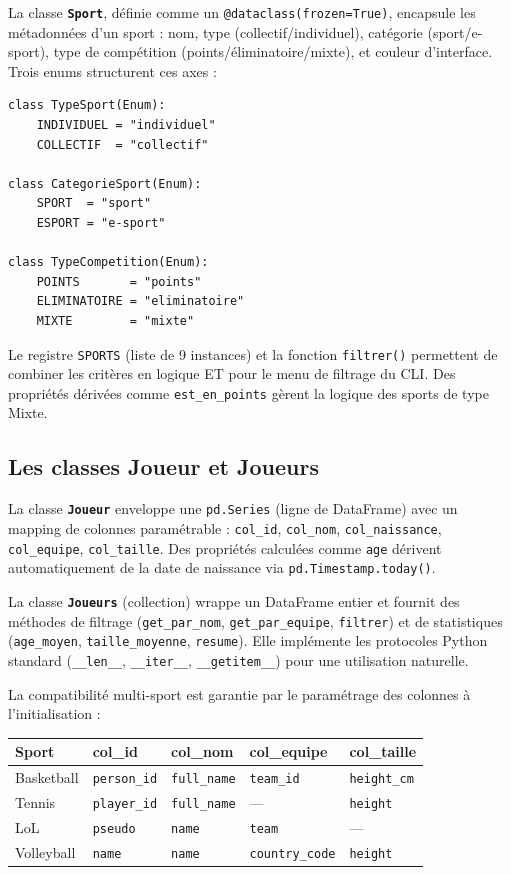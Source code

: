 \documentclass[12pt,a4paper]{article}
\newcommand{\code}[1]{\texttt{#1}}
\newcommand{\classe}[1]{\texttt{\textbf{#1}}}
\begin{document}
La classe \classe{Sport}, définie comme un \code{@dataclass(frozen=True)}, encapsule
les métadonnées d'un sport : nom, type (collectif/individuel), catégorie (sport/e-sport),
type de compétition (points/éliminatoire/mixte), et couleur d'interface. Trois enums
structurent ces axes :

\begin{lstlisting}[caption={Enums de classification des sports (src/Model/sport.py)}]
class TypeSport(Enum):
    INDIVIDUEL = "individuel"
    COLLECTIF  = "collectif"

class CategorieSport(Enum):
    SPORT  = "sport"
    ESPORT = "e-sport"

class TypeCompetition(Enum):
    POINTS       = "points"
    ELIMINATOIRE = "eliminatoire"
    MIXTE        = "mixte"
\end{lstlisting}

Le registre \code{SPORTS} (liste de 9 instances) et la fonction \code{filtrer()} permettent
de combiner les critères en logique ET pour le menu de filtrage du CLI. Des propriétés
dérivées comme \code{est\_en\_points} gèrent la logique des sports de type Mixte.

\subsection{Les classes Joueur et Joueurs}

La classe \classe{Joueur} enveloppe une \code{pd.Series} (ligne de DataFrame) avec un
mapping de colonnes paramétrable : \code{col\_id}, \code{col\_nom},
\code{col\_naissance}, \code{col\_equipe}, \code{col\_taille}. Des propriétés calculées
comme \code{age} dérivent automatiquement de la date de naissance via
\code{pd.Timestamp.today()}.

La classe \classe{Joueurs} (collection) wrappe un DataFrame entier et fournit des méthodes
de filtrage (\code{get\_par\_nom}, \code{get\_par\_equipe}, \code{filtrer}) et de
statistiques (\code{age\_moyen}, \code{taille\_moyenne}, \code{resume}). Elle implémente
les protocoles Python standard (\code{\_\_len\_\_}, \code{\_\_iter\_\_},
\code{\_\_getitem\_\_}) pour une utilisation naturelle.

La compatibilité multi-sport est garantie par le paramétrage des colonnes à
l'initialisation :

\begin{center}
\small
\begin{tabular}{lllll}
  \toprule
  \textbf{Sport} & \textbf{col\_id} & \textbf{col\_nom} & \textbf{col\_equipe} & \textbf{col\_taille} \\
  \midrule
  Basketball & \code{person\_id} & \code{full\_name} & \code{team\_id} & \code{height\_cm} \\
  Tennis     & \code{player\_id} & \code{full\_name} & ---             & \code{height} \\
  LoL        & \code{pseudo}     & \code{name}       & \code{team}     & --- \\
  Volleyball & \code{name}       & \code{name}       & \code{country\_code} & \code{height} \\
  \bottomrule
\end{tabular}
\end{center}
\end{document}

